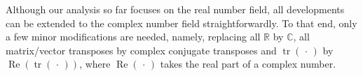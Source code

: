 \documentclass[11pt]{article}
\def\bbC{\mathbb{C}}
\def\bbR{\mathbb{R}}
\def\bbX{\mathbb{X}}
\def\cR{{\cal R}}
\def\cX{{\cal X}}
\DeclareMathOperator{\rank}{rank}
\DeclareMathOperator{\re}{Re}
\DeclareMathOperator{\tr}{tr}
\DeclareMathOperator{\T}{T}
\DeclareMathOperator{\UI}{ui}
\def\wtd{\widetilde}
\theoremstyle{definition}
\numberwithin{equation}{section}
\numberwithin{figure}{section}
\numberwithin{table}{section}
\begin{document}
%
%
%
%
%


Although our analysis so far focuses on the real number field, all developments can be
extended to the complex number field straightforwardly. To that end, only a few minor modifications are needed, namely,
replacing all $\bbR$ by $\bbC$, all matrix/vector transposes by complex conjugate transposes and $\tr(\,\cdot\,)$ by
$\re\left(\tr(\,\cdot\,)\right)$, where $\re(\,\cdot\,)$ takes the real part of a complex number.

%
%

{\small
%
%
%

}
\end{document}

